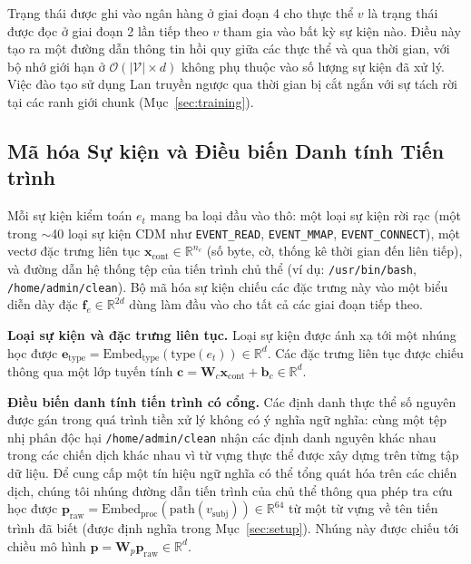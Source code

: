 \documentclass[letterpaper,twocolumn,10pt]{article}
\begin{document}
Trạng thái được ghi vào ngân hàng ở giai đoạn 4 cho thực thể $v$ là trạng thái được đọc ở giai đoạn 2 lần tiếp theo $v$ tham gia vào bất kỳ sự kiện nào. Điều này tạo ra một đường dẫn thông tin hồi quy giữa các thực thể và qua thời gian, với bộ nhớ giới hạn ở $\mathcal{O}(|\mathcal{V}| \times d)$ không phụ thuộc vào số lượng sự kiện đã xử lý. Việc đào tạo sử dụng Lan truyền ngược qua thời gian bị cắt ngắn với sự tách rời tại các ranh giới chunk (Mục~\ref{sec:training}).

\subsection{Mã hóa Sự kiện và Điều biến Danh tính Tiến trình}
\label{sec:event_encoding}

Mỗi sự kiện kiểm toán $e_t$ mang ba loại đầu vào thô: một loại sự kiện rời rạc (một trong $\sim$40 loại sự kiện CDM như \texttt{EVENT\_READ}, \texttt{EVENT\_MMAP}, \texttt{EVENT\_CONNECT}), một vectơ đặc trưng liên tục $\mathbf{x}_{\text{cont}} \in \mathbb{R}^{n_c}$ (số byte, cờ, thống kê thời gian đến liên tiếp), và đường dẫn hệ thống tệp của tiến trình chủ thể (ví dụ: \texttt{/usr/bin/bash}, \texttt{/home/admin/clean}). Bộ mã hóa sự kiện chiếu các đặc trưng này vào một biểu diễn dày đặc $\mathbf{f}_e \in \mathbb{R}^{2d}$ dùng làm đầu vào cho tất cả các giai đoạn tiếp theo.

\textbf{Loại sự kiện và đặc trưng liên tục.} Loại sự kiện được ánh xạ tới một nhúng học được $\mathbf{e}_{\text{type}} = \text{Embed}_{\text{type}}(\text{type}(e_t)) \in \mathbb{R}^d$. Các đặc trưng liên tục được chiếu thông qua một lớp tuyến tính $\mathbf{c} = \mathbf{W}_c \mathbf{x}_{\text{cont}} + \mathbf{b}_c \in \mathbb{R}^d$.

\textbf{Điều biến danh tính tiến trình có cổng.} Các định danh thực thể số nguyên được gán trong quá trình tiền xử lý không có ý nghĩa ngữ nghĩa: cùng một tệp nhị phân độc hại \texttt{/home/admin/clean} nhận các định danh nguyên khác nhau trong các chiến dịch khác nhau vì từ vựng thực thể được xây dựng trên từng tập dữ liệu. Để cung cấp một tín hiệu ngữ nghĩa có thể tổng quát hóa trên các chiến dịch, chúng tôi nhúng đường dẫn tiến trình của chủ thể thông qua phép tra cứu học được $\mathbf{p}_{\text{raw}} = \text{Embed}_{\text{proc}}(\text{path}(v_{\text{subj}})) \in \mathbb{R}^{64}$ từ một từ vựng về tên tiến trình đã biết (được định nghĩa trong Mục~\ref{sec:setup}). Nhúng này được chiếu tới chiều mô hình $\mathbf{p} = \mathbf{W}_p \mathbf{p}_{\text{raw}} \in \mathbb{R}^d$.
\end{document}
